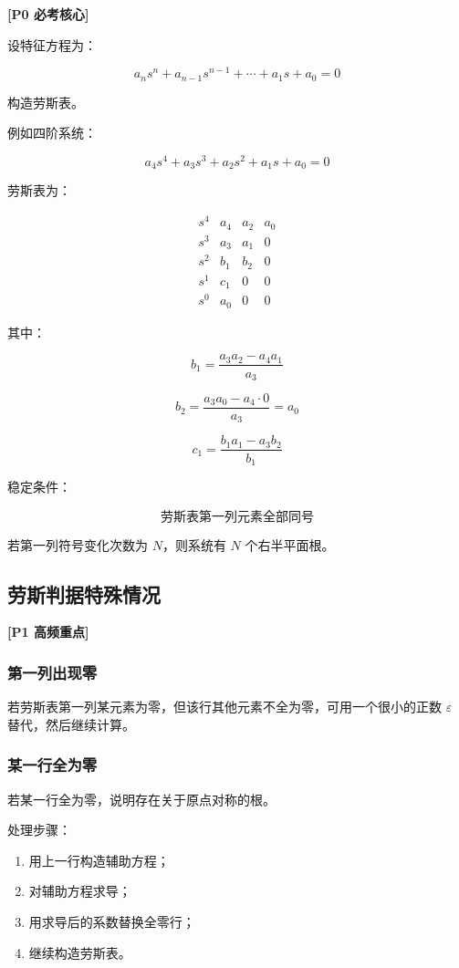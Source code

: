\documentclass[UTF8,a4paper,12pt]{ctexart}
\newcommand{\Pzero}{\textcolor{p0}{\textbf{[P0 必考核心]}}}
\newcommand{\Pone}{\textcolor{p1}{\textbf{[P1 高频重点]}}}
\begin{document}
\Pzero

设特征方程为：

\[
a_ns^n+a_{n-1}s^{n-1}+\cdots+a_1s+a_0=0
\]

构造劳斯表。

例如四阶系统：

\[
a_4s^4+a_3s^3+a_2s^2+a_1s+a_0=0
\]

劳斯表为：

\[
\begin{array}{c|ccc}
s^4 & a_4 & a_2 & a_0 \\
s^3 & a_3 & a_1 & 0 \\
s^2 & b_1 & b_2 & 0 \\
s^1 & c_1 & 0 & 0 \\
s^0 & a_0 & 0 & 0
\end{array}
\]

其中：

\[
b_1=\frac{a_3a_2-a_4a_1}{a_3}
\]

\[
b_2=\frac{a_3a_0-a_4\cdot 0}{a_3}=a_0
\]

\[
c_1=\frac{b_1a_1-a_3b_2}{b_1}
\]

稳定条件：

\[
\text{劳斯表第一列元素全部同号}
\]

若第一列符号变化次数为 $N$，则系统有 $N$ 个右半平面根。

\subsection{劳斯判据特殊情况}

\Pone

\subsubsection{第一列出现零}

若劳斯表第一列某元素为零，但该行其他元素不全为零，可用一个很小的正数 $\varepsilon$ 替代，然后继续计算。

\subsubsection{某一行全为零}

若某一行全为零，说明存在关于原点对称的根。

处理步骤：

\begin{enumerate}
    \item 用上一行构造辅助方程；
    \item 对辅助方程求导；
    \item 用求导后的系数替换全零行；
    \item 继续构造劳斯表。
\end{enumerate}
\end{document}
